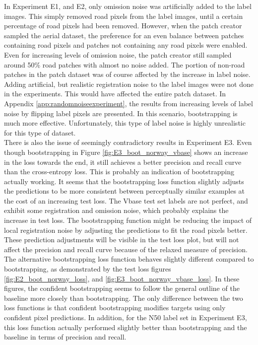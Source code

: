 In Experiment E1, and E2, only omission noise was artificially added to the label images. This simply removed road pixels from the label images, until a certain percentage of road pixels had been removed. However, when the patch creator sampled the aerial dataset, the preference for an even balance between patches containing road pixels and patches not containing any road pixels were enabled. Even for increasing levels of omission noise, the patch creator still sampled around 50\% road patches with almost no noise added. The portion of non-road patches in the patch dataset was of course affected by the increase in label noise. Adding artificial, but realistic registration noise to the label images were not done in the experiments. This would have affected the entire patch dataset. In Appendix \ref{app:randomnoiseexperiment}, the results from increasing levels of label noise by flipping label pixels are presented. In this scenario, bootstrapping is much more effective. Unfortunately, this type of label noise is highly unrealistic for this type of dataset.\\

There is also the issue of seemingly contradictory results in Experiment E3. Even though bootstrapping in Figure \ref{fig:E3_boot_norway_vbase} shows an increase in the loss towards the end, it still achieves a better precision and recall curve than the cross-entropy loss. This is probably an indication of bootstrapping actually working. It seems that the bootstrapping loss function slightly adjusts the predictions to be more consistent between perceptually similar examples at the cost of an increasing test loss. The Vbase test set labels are not perfect, and exhibit some registration and omission noise, which probably explains the increase in test loss. The bootstrapping function might be reducing the impact of local registration noise by adjusting the predictions to fit the road pixels better. These prediction adjustments will be visible in the test loss plot, but will not affect the precision and recall curve because of the relaxed measure of precision. \\

The alternative bootstrapping loss function behaves slightly different compared to bootstrapping, as demonstrated by the test loss figures \ref{fig:E2_boot_norway_loss}, and \ref{fig:E3_boot_norway_vbase_loss}. In these figures, the confident bootstrapping seems to follow the general outline of the baseline more closely than bootstrapping. The only difference between the two loss functions is that confident bootstrapping modifies targets using only confident pixel predictions. In addition, for the N50 label set in Experiment E3, this loss function actually performed slightly better than bootstrapping and the baseline in terms of precision and recall. \\ 

